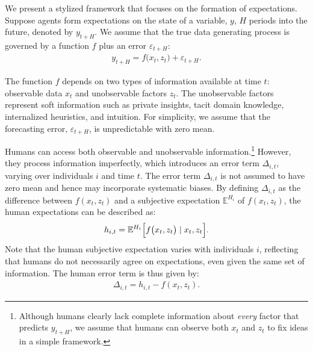 \documentclass[11pt,letterpaper]{scrartcl}
\begin{document}
We present a stylized framework that focuses on the formation of expectations. Suppose agents form expectations on the state of a variable, $y$, $H$ periods into the future, denoted by $y_{t+H}$. We assume that the true data generating process is governed by a function \(f\) plus an error \(\varepsilon_{t+H}\):
\begin{align}
    y_{t+H} = f\bigl(x_t, z_t\bigr) + \varepsilon_{t+H}.  
\end{align}

The function \(f\) depends on two types of information available at time \(t\): observable data \(x_t\) and unobservable factors \(z_t\). The unobservable factors represent soft information such as private insights, tacit domain knowledge, internalized heuristics, and intuition. For simplicity, we assume that the forecasting error, \(\varepsilon_{t+H}\), is unpredictable with zero mean. 

Humans can access both observable and unobservable information.\footnote{Although humans clearly lack complete information about \textit{every} factor that predicts $y_{t+H}$, we assume that humans can observe both $x_t$ and $z_t$ to fix ideas in a simple framework.} However, they process information imperfectly, which introduces an error term \(\Delta_{i,t}\), varying over individuals \(i\) and time \(t\). The error term \(\Delta_{i,t}\) is not assumed to have zero mean and hence may incorporate systematic biases. By defining \(\Delta_{i,t}\) as the difference between $f(x_t,z_t)$ and a subjective expectation $\mathbb{E}^{H_i}$ of $f(x_t,z_t)$, the human expectations can be described as:
\begin{align}
    h_{i,t} = \mathbb{E}^{H_i}\Bigl[f\bigl(x_t, z_t\bigr) \mid x_t,z_t\Bigr].
\end{align}
Note that the human subjective expectation varies with individuals $i$, reflecting that humans do not necessarily agree on expectations, even given the same set of information. The human error term is thus given by: 
\begin{align}
    \Delta_{i,t} = h_{i,t}-f(x_t,z_t).
\end{align}
\end{document}
